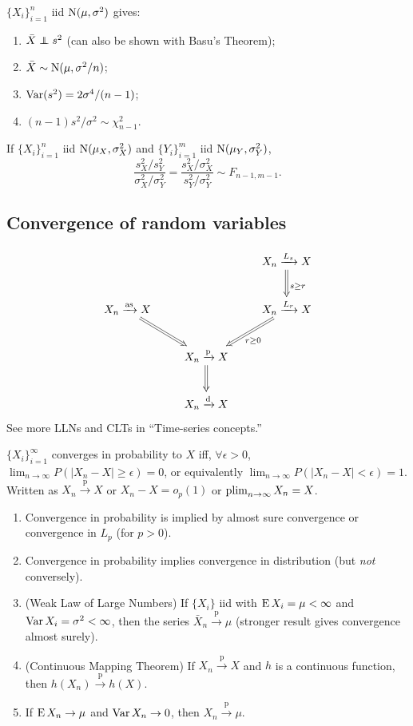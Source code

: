 \documentclass[8pt,letterpaper, landscape]{extarticle} %
\begin{document}
\begin{multicols}{3}
\begin{description}
 $ \{ X_i \}_{i=1}^{n} $ iid $ \operatorname{N} (\mu, \sigma^2 ) $ gives:
\begin{enumerate}
\item $ \bar{X} \independent s^2 $ (can also be shown with Basu's Theorem);
\item $ \bar{X} \sim \operatorname{N} (\mu, \sigma^2 / n ) $;
\item $ \operatorname{Var} (s^2) = 2 \sigma^4 / (n-1) $;
\item $ (n-1) s^2 / \sigma^2 \sim \chi^2_{n-1} $.
\end{enumerate}
If $ \{ X_i \}_{i=1}^{n} $ iid $ \operatorname{N} (\mu_X, \sigma_X^2 ) $ and $ \{ Y_i \}_{i=1}^{m} $ iid $ \operatorname{N} (\mu_Y, \sigma_Y^2 ) $, $$ \frac{s_X^2 / s_Y^2}{\sigma_X^2 / \sigma_Y^2} = \frac{s_X^2 / \sigma_X^2}{s_Y^2 / \sigma_Y^2} \sim F_{n-1, m-1} . $$

\subsection{Convergence of random variables}
\begin{displaymath}
\xymatrix{
 & & X_n \xrightarrow{L_s} X \ar@{=>}[d]^{s \geq r} \\
X_n \xrightarrow{\text{as}} X \ar@{=>}[dr] & & X_n \xrightarrow{L_r} X \ar@{=>}[dl]^{r \geq 0} \\
 & X_n \xrightarrow{\text{p}} X \ar@{=>}[d] & \\
 & X_n \xrightarrow{\text{d}} X &
}
\end{displaymath}
See more LLNs and CLTs in ``Time-series concepts.''

 $ \{ X_i \}_{i=1}^{\infty} $ converges in probability to $ X $ iff, $ \forall \epsilon > 0 $, $ \lim_{n \to \infty} P( |X_n - X| \geq \epsilon ) =0 $, or equivalently $ \lim_{n \to \infty} P( |X_n - X| < \epsilon ) = 1 $. Written as $ X_n \xrightarrow{\text{p}} X $ or $ X_n - X = o_p (1) $ or $ \operatorname*{plim}_{n \to \infty} X_n = X $.
\begin{enumerate}
\item Convergence in probability is implied by almost sure convergence or convergence in $ L_p $ (for $ p>0 $).
\item Convergence in probability implies convergence in distribution (but \textit{not} conversely).
\item (Weak Law of Large Numbers) If $ \{ X_i \} $ iid with $ \operatorname{E} X_i = \mu < \infty $ and $ \operatorname{Var} X_i = \sigma^2 < \infty $, then the series $ \bar{X}_n \xrightarrow{\text{p}} \mu $ (stronger result gives convergence almost surely).
\item (Continuous Mapping Theorem) If $ X_n \xrightarrow{\text{p}} X $ and $ h $ is a continuous function, then $ h(X_n) \xrightarrow{\text{p}} h(X) $.
\item If $ \operatorname{E} X_n \to \mu $ and $ \operatorname{Var} X_n \to 0 $, then $ X_n \xrightarrow{\text{p}} \mu $.
\end{enumerate}


\end{description}
\end{multicols}
\end{document}
